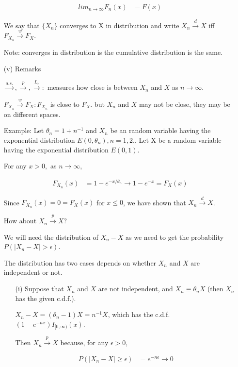 \documentclass[11pt]{article} %
\begin{document}
\begin{itemize}
\begin{align*}
	lim_{n \rightarrow \infty} F_n(x) &= F(x)
\end{align*}

We say that $\{ X_n \}$ converges to X in distribution and write $X_n \xrightarrow {d} X$ iff $F_{X_n} \xrightarrow {w} F_X$. 

Note: converges in distribution is the cumulative distribution is the same.

\item[(v)] Remarks

$\xrightarrow {a.s.}, \xrightarrow {p}, \xrightarrow {L_r}: $ measures how close is between $X_n$ and $X$ as $n \rightarrow \infty$. 

$F_{X_n} \xrightarrow {w} F_{X}: F_{X_n}$ is close to $F_X$. but $X_n$ and $X$ may not be close, they may be on different spaces.

Example: Let $\theta_n = 1 + n^{-1}$ and $X_n$ be an random variable having the exponential distribution $E(0, \theta_n), n=1,2..$
Let X be a random variable having the exponential distribution $E(0,1)$. 

For any $x>0,$ as $n \rightarrow \infty$,

\begin{align*}
	F_{X_n}(x) &= 1 - e^{-x/\theta_n} \rightarrow 1- e^{-x} = F_X(x)
\end{align*}

Since $F_{X_n}(x) = 0 = F_X(x)$ for $x \leq 0$, we have shown that $X_n \xrightarrow {d} X$.

How about $X_n \xrightarrow {p} X$?

We will need the distribution of $X_n -X$ as we need to get the probability $P(|X_n - X|> \epsilon )$.

The distribution has two cases depends on whether $X_n$ and $X$ are independent or not. 

\begin{itemize}
\item[(i)] Suppose that $X_n$ and $X$ are not independent, and $X_n \equiv \theta_n X$ (then $X_n$ has the given c.d.f.).

$X_n - X = (\theta_n -1) X = n^{-1} X$, which has the c.d.f. $(1- e^{-nx})I_{[0, \infty)} (x)$. 

Then $X_n \xrightarrow {p} X$ because, for any $\epsilon > 0$, 
 
 \begin{align*}
	P(| X_n -X | \geq \epsilon) &= e^{-n\epsilon} \rightarrow 0
\end{align*}


\end{itemize}
\end{itemize}
\end{document}
